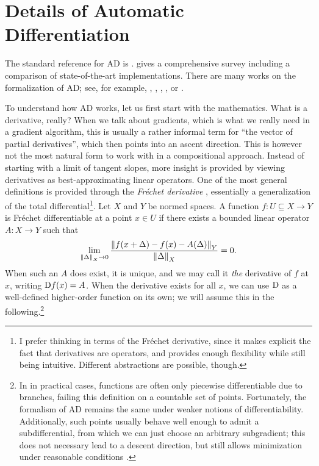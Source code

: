 \chapter{Details of Automatic Differentiation}
\label{ch:ad-details}

The standard reference for AD is \textcite{griewank2008evaluating}.  \textcite{baydin2018automatic}
gives a comprehensive survey including a comparison of state-of-the-art implementations.  There are
many works on the formalization of AD; see, for example, \textcite{abadi2020simple},
\textcite{vytiniotis2019differentiable}, \textcite{wang2019demystifying},
\textcite{sajovic2016operational}, or \textcite{elliott2018simple}.

To understand how AD works, let us first start with the mathematics.  What is a derivative, really?
When we talk about gradients, which is what we really need in a gradient algorithm, this is usually
a rather informal term for \enquote{the vector of partial derivatives}, which then points into an
ascent direction.  This is however not the most natural form to work with in a compositional
approach.  Instead of starting with a limit of tangent slopes, more insight is provided by viewing
derivatives as best-approximating linear operators.  One of the most general definitions is provided
through the \emph{Fréchet derivative} \parencite[p. 463]{bronstein1995taschenbuch}, essentially a
generalization of the total differential\footnote{I prefer thinking in terms of the Fréchet
  derivative, since it makes explicit the fact that derivatives are operators, and provides enough
  flexibility while still being intuitive.  Different abstractions are possible, though.}.  Let
\(X\) and \(Y\) be normed spaces.  A function \(f: U \subseteq X \to Y\) is Fréchet differentiable
at a point \(x \in U\) if there exists a bounded linear operator \(A: X \to Y\) such that
\begin{equation}
  \label{eq:frechet}
  \lim_{\left\lVert\Delta\right\rVert_X \to 0} \frac{\left\lVert f(x + \Delta) - f(x) -
      A(\Delta)\right\rVert_Y}{\left\lVert\Delta\right\rVert_X} = 0.
\end{equation}
When such an \(A\) does exist, it is unique, and we may call it \emph{the} derivative of \(f\) at
\(x\), writing \(\mathop{}\!\mathrm{D} f(x) = A\).  When the derivative exists for all \(x\), we can use \(\mathop{}\!\mathrm{D}\) as
a well-defined higher-order function on its own; we will assume this in the following.\footnote{In
  in practical cases, functions are often only piecewise differentiable due to branches, failing
  this definition on a countable set of points.  Fortunately, the formalism of AD remains the same
  under weaker notions of differentiability.  Additionally, such points usually behave well enough
  to admit a subdifferential, from which we can just choose an arbitrary subgradient; this does not
  necessary lead to a descent direction, but still allows minimization under reasonable conditions
  \parencites[see][section 6.1]{pock2017convex}[][chapter
  14]{griewank2008evaluating}{abadi2020simple}.}

